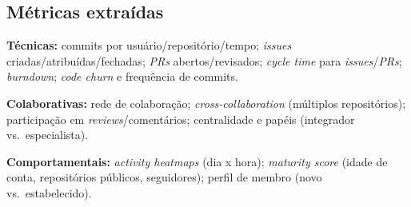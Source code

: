 \documentclass[
	12pt,
	openright,
	oneside,
	a4paper,
	brazil
]{abntex2}
\begin{document}
\begin{apendicesenv}
\section*{Métricas extraídas}
\textbf{Técnicas:} commits por usuário/repositório/tempo; \textit{issues} criadas/atribuídas/fechadas; \textit{PRs} abertos/revisados; \textit{cycle time} para \textit{issues}/\textit{PRs}; \textit{burndown}; \textit{code churn} e frequência de commits.

\noindent\textbf{Colaborativas:} rede de colaboração; \textit{cross-collaboration} (múltiplos repositórios); participação em \textit{reviews}/comentários; centralidade e papéis (integrador vs.\ especialista).

\noindent\textbf{Comportamentais:} \textit{activity heatmaps} (dia x hora); \textit{maturity score} (idade de conta, repositórios públicos, seguidores); perfil de membro (novo vs.\ estabelecido).


\end{apendicesenv}
\end{document}
